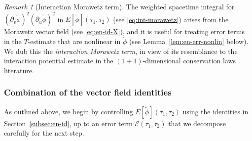 \documentclass[10pt, reqno]{amsart}
\theoremstyle{definition}
\theoremstyle{remark}
\newtheorem{remark}[theorem]{Remark}
\theoremstyle{conjecture}
\numberwithin{equation}{section}
\newcommand{\rd}{\partial}
\newcommand{\0}{\emptyset}
\newcommand{\calE}{\mathcal E}
\newcommand{\phibg}{\overline{\phi}}				%
\newcommand{\phidf}{\widetilde{\phi}}				%
\begin{document}
\begin{remark}[Interaction Morawetz term] \label{rem:int-morawetz} 
The weighted spacetime integral for $(\rd_{v} \phidf)^{2} (\rd_{u} \phidf)^{2}$ in $E[\phidf](\tau_{1}, \tau_{2})$ (see \eqref{eq:int-morawetz}) arises from the Morawetz vector field (see \eqref{eq:en-id-X}), and it is useful for treating error terms in the $T$-estimate that are nonlinear in $\phidf$ (see Lemma~\ref{lem:en-err-nonlin} below). We dub this the \emph{interaction Morawetz term}, in view of its resemblance to the interaction potential estimate in the $(1+1)$-dimensional conservation laws literature.
\end{remark}

\subsubsection*{Combination of the vector field identities}

As outlined above, we begin by controlling $E[\phidf](\tau_{1}, \tau_{2})$ using the identities in Section~\ref{subsec:en-id}, up to an error term $\calE(\tau_{1}, \tau_{2})$ that we decompose carefully for the next step. 
\end{document}
